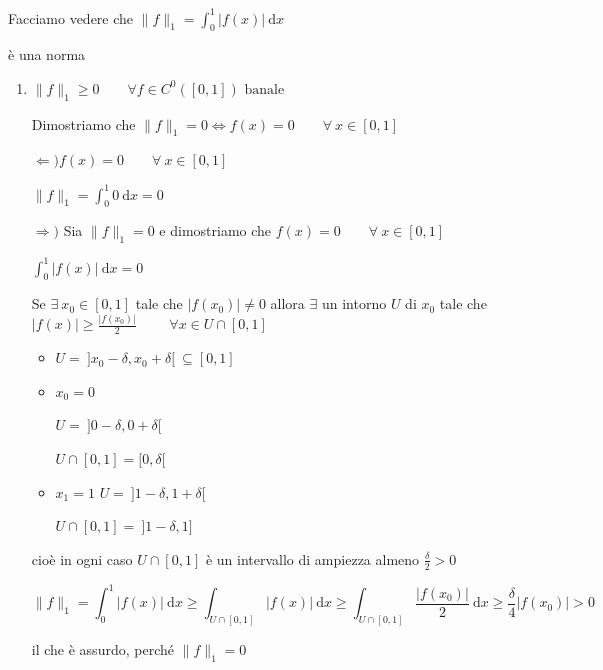 \begin{exbar}
\begin{example}
		Facciamo vedere che $\parallel f\parallel_1 = \int_{0}^{1} |f(x)| \ \mathrm{d}x$
		
		è una norma
	\begin{enumerate}
		\item $\parallel f \parallel_1 \geq 0 \qquad \forall f \in C^0 ([0,1]) \text{ banale}$
		
		Dimostriamo che $\parallel f \parallel_1 = 0 \iff f(x) = 0 \qquad \forall \ x \in [0,1]$
		
		$\Leftarrow) f(x) = 0 \qquad \forall \ x \in[0,1]$
		
		$\parallel f \parallel_1 = \int_{0}^{1} 0 \ \mathrm{d}x = 0$
		
		$\Rightarrow)$ Sia $\parallel f \parallel_1 = 0$ e dimostriamo che $f(x) = 0 \qquad \forall \ x \in [0,1]$
		
		$\int_{0}^{1} |f(x)| \ \mathrm{d}x = 0$
		
		Se $\exists \ x_0 \in [0,1]$ tale che $|f(x_0)| \neq 0$ allora $\exists$ un intorno $U$ di $x_0 $ tale che $|f(x)| \geq \frac{|f(x_0)|}{2}$ $\qquad \forall x \in U \cap [0,1]$ 
		
		\begin{itemize}
			\item $U = \ ]x_0 - \delta, x_0 + \delta[ \ \subseteq [0,1]$
	
			\item $x_0=0$
			
			$U= \ ]0 - \delta, 0 + \delta[$
			
			$U \cap [0,1] = [0, \delta[$
			
			\item $x_1 = 1$
			 $U= \ ]1 - \delta, 1 + \delta[$
			 
			$U \cap [0, 1] = \ ]1 - \delta, 1]$
		\end{itemize}
		
		cioè in ogni caso $U \cap [0,1]$ è un intervallo di ampiezza almeno $\frac{\delta}{2}>0$
		
		\begin{equation*}
			\parallel f\parallel_1 = \int_{0}^{1} |f(x)| \ \mathrm{d}x \geq \int_{U \cap [0,1]} |f(x)| \ \mathrm{d}x \geq \int_{U \cap [0,1]} \frac{|f(x_0)|}{2} \ \mathrm{d}x \geq \frac{\delta}{4} |f(x_0)| > 0
		\end{equation*}
		
		il che è assurdo, perché $\parallel f\parallel_1 = 0$
		

\end{enumerate}
\end{example}
\end{exbar}
